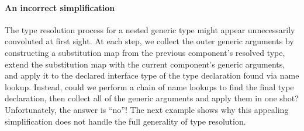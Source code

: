 \documentclass[../generics]{subfiles}
\begin{document}
\paragraph{An incorrect simplification}
The type resolution process for a nested generic type might appear unnecessarily convoluted at first sight. At each step, we collect the outer generic arguments by constructing a substitution map from the previous component's resolved type, extend the substitution map with the current component's generic arguments, and apply it to the declared interface type of the type declaration found via name lookup. Instead, could we perform a chain of name lookups to find the final type declaration, then collect all of the generic arguments and apply them in one shot? Unfortunately, the answer is ``no''! The next example shows why this appealing simplification does not handle the full generality of type resolution.
\end{document}
